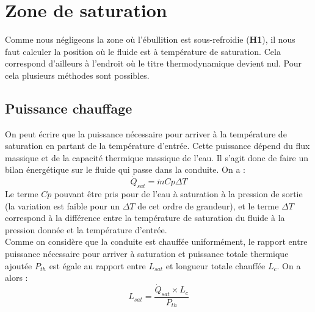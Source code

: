 \section{Zone de saturation\label{section:sat}}
Comme nous négligeons la zone où l'ébullition est sous-refroidie (\textbf{H1}), il nous faut calculer la position où le fluide est à température de saturation. Cela correspond d'ailleurs à l'endroit où le titre thermodynamique devient nul. Pour cela plusieurs méthodes sont possibles.


\subsection{Puissance chauffage}
On peut écrire que la puissance nécessaire pour arriver à la température de saturation en partant de la température d'entrée. Cette puissance dépend du flux massique et de la capacité thermique massique de l'eau. Il s'agit donc de faire un bilan énergétique sur le fluide qui passe dans la conduite. On a :
\begin{equation}
    \dot{Q}_{sat} = \dot{m} Cp \Delta T
\end{equation}
Le terme $Cp$ pouvant être pris pour de l'eau à saturation à la pression de sortie (la variation est faible pour un $\Delta T$ de cet ordre de grandeur), et le terme $\Delta T$ correspond à la différence entre la température de saturation du fluide à la pression donnée et la température d'entrée.\\ 
Comme on considère que la conduite est chauffée uniformément, le rapport entre puissance nécessaire pour arriver à saturation et puissance totale thermique ajoutée $P_{th}$ est égale au rapport entre $L_{sat}$ et longueur totale chauffée $L_c$. On a alors :
\begin{equation}
    L_{sat}= \frac{ \dot{Q}_{sat}\times L_c}{P_{th}}
\end{equation}

